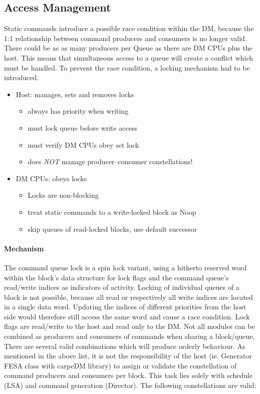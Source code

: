 \subsection{Access Management}
\label{ssec:locks}
Static commands introduce a possible race condition within the DM, because the 1:1 relationship between command producers and consumers is no longer valid. There could be as as many producers per Queue as there are DM CPUs plus the host. This means that simultaneous access to a queue will create a conflict which must be handled. To prevent the race condition, a locking mechanism had to be introduced.
\begin{itemize}
  \item{Host: manages, sets and removes locks}
  \begin{itemize}
    \item{always has priority when writing}
    \item{must lock queue before write access}
    \item{must verify DM CPUs obey set lock}
    \item{does \emph{NOT} manage producer--consumer constellations!}
  \end{itemize}
  \item{DM CPUs: obeys locks}
  \begin{itemize}
   \item{Locks are non-blocking}
   \item{treat static commands to a write-locked block as Noop} 
   \item{skip queues of read-locked blocks, use default successor}
  \end{itemize}
\end{itemize}







\paragraph{Mechanism}
The command queue lock is a spin lock variant, using a hitherto reserved word within the block's data structure for lock flags and the command queue's read/write indices as indicators of activity. 
Locking of individual queues of a block is not possible, because all read or respectively all write indices are located in a single data word. Updating the indices of different priorities from the host side would therefore still access the same word and cause a race condition. Lock flags are read/write to the host and read only to the DM. 
Not all modules can be combined as producers and consumers of commands when sharing a block/queue. There are several valid combinations which will produce orderly behaviour.
As mentioned in the above list, it is not the responsibility of the host (ie. Generator FESA class with carpeDM library)
to assign or validate the constellation of command producers and consumers per block. This task lies solely with schedule (LSA) and command generation (Director). The following constellations are valid:


